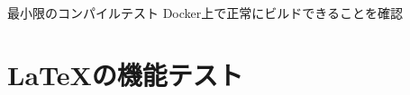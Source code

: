 \documentclass{cls/basic_report}
\begin{document}
\tableofcontents

\clearpage

最小限のコンパイルテスト\p
Docker上で正常にビルドできることを確認\p

\chapter{LaTeXの機能テスト}









\printbibliography
\end{document}
